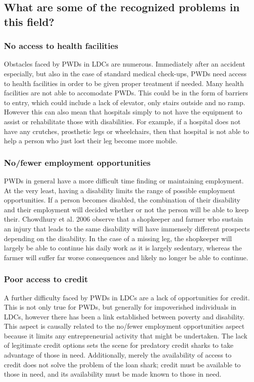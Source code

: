 \documentclass{lps}
\begin{document}
\subsection{What are some of the recognized problems in this field?}

\subsubsection{No access to health facilities}

Obstacles faced by PWDs in LDCs are numerous. Immediately after an accident
especially, but also in the case of standard medical check-ups, PWDs need
access to health facilities in order to be given proper treatment if needed.
Many health facilities are not able to accomodate PWDs. This could be in the
form of barriers to entry, which could include a lack of elevator, only stairs
outside and no ramp. However this can also mean that hospitals simply to not
have the equipment to assist or rehabilitate those with disabilities. For
example, if a hospital does not have any crutches, prosthetic legs or
wheelchairs, then that hospital is not able to help a person who just lost
their leg become more mobile. 


\subsubsection{No/fewer employment opportunities}

PWDs in general have a more difficult time finding or maintaining employment.
At the very least, having a disability limits the range of possible employment
opportunities. If a person becomes disabled, the combination of their
disability and their employment will decided whether or not the person will be
able to keep their. Chowdhury et al. 2006 observe that a shopkeeper and farmer
who sustain an injury that leads to the same disability will have immensely
different prospects depending on the disability. In the case of a missing leg,
the shopkeeper will largely be able to continue his daily work as it is
largely sedentary, whereas the farmer will suffer far worse consequences and
likely no longer be able to continue.

\subsubsection{Poor access to credit}

A further difficulty faced by PWDs in LDCs are a lack of opportunities for
credit. This is not only true for PWDs, but generally for impoverished
individuals in LDCs, however there has been a link established between poverty
and disability. This aspect is causally related to the no/fewer employment
opportunities aspect because it limits any entrepreneurial activity that might
be undertaken. The lack of legitimate credit options sets the scene for
predatory credit sharks to take advantage of those in need. Additionally,
merely the availability of access to credit does not solve the problem of the
loan shark; credit must be available to those in need, and its availability
must be made known to those in need.
\end{document}
